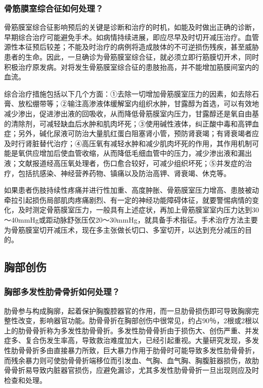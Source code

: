 \subsubsection{骨筋膜室综合征如何处理？}

骨筋膜室综合征影响预后的关键是诊断和治疗的时机，如能及时做出正确的诊断，早期综合治疗可能避免手术。如病情持续进展，即应尽早及时切开减压治疗。血管源性本征预后较差；不能及时治疗的病例将造成肢体的不可逆损伤残疾，甚至威胁患者的生命。因此，一旦确诊为骨筋膜室综合征，就必须立即行筋膜切开术，同时积极治疗原发病。对将发生骨筋膜室综合征的患肢抬高，并不能增加筋膜间室内的血流。

综合治疗措施包括以下几个方面：①去除一切增加骨筋膜室压力的因素，如去除石膏、放松绷带等；②输注高渗液体缓解室内组织水肿，甘露醇为首选，可以有效地减少渗出，促进渗出液的回吸收，从而降低骨筋膜室内压力，甘露醇还是氧自由基的清除剂，可减轻缺血后水肿和肌肉坏死；③使用碱性液体，纠正酸中毒和高钾血症；另外，碱化尿液可防治大量肌红蛋白阻塞肾小管，预防肾衰竭；有肾衰竭者应及时行肾脏替代治疗；④高压氧有减轻水肿和减少肌肉坏死的作用，其作用机制可能是氧供应增加后使血管收缩，从而降低毛细血管中的压力，减少渗出液和漏出液；文献报道经高压氧处理者，伤口愈合较好，可减少组织坏死；⑤并发症的治疗，包括抗感染、神经营养药物、镇痛以及防治高钾、肾衰竭、休克等。

如果患者伤肢持续性疼痛并进行性加重、高度肿胀、骨筋膜室压力增高、患肢被动牵拉引起损伤局部肌肉疼痛剧烈、有一定的神经功能障碍体征，就要警惕病情的变化，及时测定骨筋膜室压力，一般具有上述症状，再加上骨筋膜室室内压力达到30～40mmHg或距动脉舒张压仅20～30mmHg，就具备手术指征。手术治疗方法主要为骨筋膜室切开减压术，现在多主张做长切口、多室切开，以达到充分减压的目的。

\subsection{胸部创伤}

\subsubsection{胸部多发性肋骨骨折如何处理？}

肋骨参与构成胸廓，起着保护胸腹腔器官的作用，而一旦肋骨损伤即可导致胸廓完整性改变，影响器官功能。肋骨骨折在胸部创伤中很常见，约占90％，2根或2根以上的肋骨骨折称为多发性肋骨骨折。多发性肋骨骨折由于损伤大、创伤严重、并发症多、复合伤发生率高，导致救治难度加大，已经引起重视。大量研究发现，多发性肋骨骨折多由直接暴力所致，巨大暴力作用于肋骨时可能导致多发性肋骨骨折，而残余暴力则可使肋骨骨折端移位而引发血、气胸、血气胸、胸腹脏器损伤，故肋骨骨折易导致内脏器官损伤，应避免漏诊，尤其多发性肋骨骨折一旦出现则应及时检查和处理。

